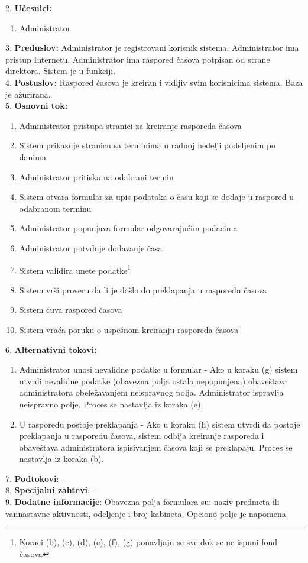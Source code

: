 \documentclass{article}
\begin{document}
2. \textbf{Učesnici:}
\begin{enumerate} [label=(\alph*)]
\item Administrator
\end{enumerate} 

3. \textbf{Preduslov:} Administrator je registrovani korisnik sistema. Administrator ima pristup Internetu. Administrator ima raspored časova potpisan od strane direktora. Sistem je u funkciji. \\

4. \textbf{Postuslov:} Raspored časova je kreiran i vidljiv svim korisnicima sistema. Baza je ažurirana. \\

5. \textbf{Osnovni tok:} 
\begin{enumerate} [label=(\alph*)]
\item Administrator pristupa stranici za kreiranje rasporeda časova
\item Sistem prikazuje stranicu sa terminima u radnoj nedelji podeljenim po danima
\item Administrator pritiska na odabrani termin
\item Sistem otvara formular za upis podataka o času koji se dodaje u raspored u odabranom terminu
\item Administrator popunjava formular odgovarajućim podacima
\item Administrator potvđuje dodavanje časa 
\item Sistem validira unete podatke\footnote{Koraci (b), (c), (d), (e), (f), (g) ponavljaju se sve dok se ne ispuni fond časova}
\item Sistem vrši proveru da li je došlo do preklapanja u rasporedu časova
\item Sistem čuva raspored časova
\item Sistem vraća poruku o uspešnom kreiranju rasporeda časova
\end{enumerate}

6. \textbf{Alternativni tokovi:}
\begin{enumerate} [label=(\roman*)]
\item Administrator unosi nevalidne podatke u formular - Ako u koraku (g) sistem utvrdi nevalidne podatke (obavezna polja ostala nepopunjena) obaveštava administratora obeležavanjem neispravnog polja. Administrator ispravlja neispravno polje. Proces se nastavlja iz koraka (e).
\item U rasporedu postoje preklapanja - Ako u koraku (h) sistem utvrdi da postoje preklapanja u rasporedu časova, sistem odbija kreiranje rasporeda i obaveštava administratora ispisivanjem časova koji se preklapaju. Proces se nastavlja iz koraka (b).
\end{enumerate}

7. \textbf{Podtokovi}:  - \\

8. \textbf{Specijalni zahtevi}: - \\

9. \textbf{Dodatne informacije}: Obavezna polja formulara su: naziv predmeta ili vannastavne aktivnosti, odeljenje i broj kabineta. Opciono polje je napomena. \\
\end{document}
